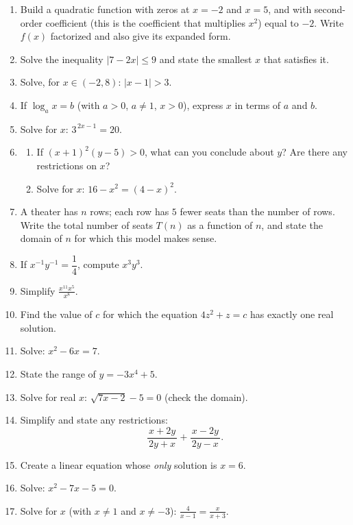 \documentclass{article}
\begin{document}
\begin{enumerate}[label=\textbf{\arabic*.}, leftmargin=*, itemsep=0.6em]
\item Build a quadratic function with zeros at $x=-2$ and $x=5$, and with second-order coefficient (this is the coefficient that multiplies $x^2$) equal to $-2$. Write $f(x)$ factorized and also give its expanded form.

\item Solve the inequality $|7-2x|\le 9$ and state the smallest $x$ that satisfies it.

\item Solve, for $x\in(-2,8)$: $|x-1|>3$.

\item If $\log_a x=b$ (with $a>0$, $a\ne1$, $x>0$), express $x$ in terms of $a$ and $b$.

\item Solve for $x$: $3^{\,2x-1}=20$.

\item 
\begin{enumerate}[label=(\alph*)]
\item If $(x+1)^2(y-5)>0$, what can you conclude about $y$? Are there any restrictions on $x$?
\item Solve for $x$: $16-x^2=(4-x)^2$.
\end{enumerate}

\item A theater has $n$ rows; each row has $5$ fewer seats than the number of rows. Write the total number of seats $T(n)$ as a function of $n$, and state the domain of $n$ for which this model makes sense.

\item If $x^{-1}y^{-1}=\dfrac14$, compute $x^3y^3$.

\item Simplify $\displaystyle \frac{x^{11}x^5}{x^8}$.

\item Find the value of $c$ for which the equation $4z^2+z=c$ has exactly one real solution.

\item Solve: $x^2-6x=7$.

\item State the range of $y=-3x^4+5$.

\item Solve for real $x$: $\sqrt{7x-2}-5=0$ (check the domain).

\item Simplify and state any restrictions:
\[
\frac{x+2y}{\,2y+x\,}+\frac{x-2y}{\,2y-x\,}.
\]

\item Create a linear equation whose \emph{only} solution is $x=6$.

\item Solve: $x^2-7x-5=0$.

\item Solve for $x$ (with $x\ne1$ and $x\ne -3$): $\displaystyle \frac{4}{x-1}=\frac{x}{x+3}$.

\end{enumerate}
\end{document}
